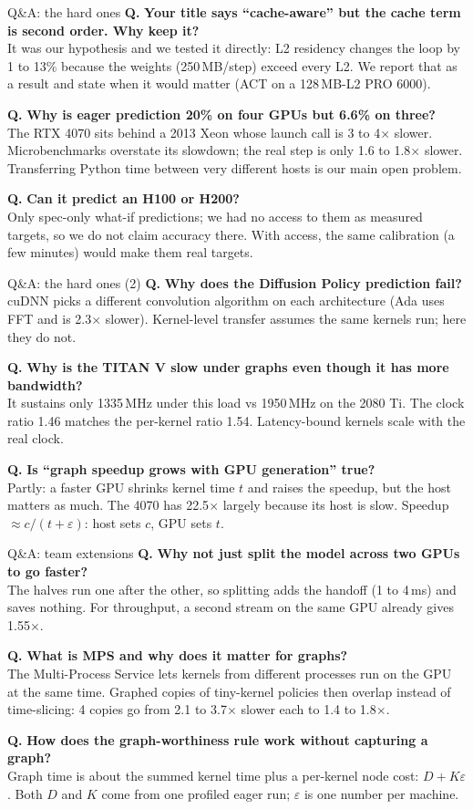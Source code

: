 \documentclass[aspectratio=169,10pt]{beamer}
\newcommand{\qa}[2]{\textbf{\textcolor{accent}{Q.}} \textbf{#1}\\[0.2em]{\small #2}\par\medskip}
\begin{document}
\begin{frame}{Q\&A: the hard ones}
\qa{Your title says ``cache-aware'' but the cache term is second order. Why keep it?}{It was
our hypothesis and we tested it directly: L2 residency changes the loop by 1 to 13\% because
the weights (250\,MB/step) exceed every L2. We report that as a result and state when it would
matter (ACT on a 128\,MB-L2 PRO 6000).}
\qa{Why is eager prediction 20\% on four GPUs but 6.6\% on three?}{The RTX 4070 sits behind a
2013 Xeon whose launch call is 3 to 4$\times$ slower. Microbenchmarks overstate its slowdown;
the real step is only 1.6 to 1.8$\times$ slower. Transferring Python time between very different
hosts is our main open problem.}
\qa{Can it predict an H100 or H200?}{Only spec-only what-if predictions; we had no access to
them as measured targets, so we do not claim accuracy there. With access, the same calibration
(a few minutes) would make them real targets.}
\end{frame}

\begin{frame}{Q\&A: the hard ones (2)}
\qa{Why does the Diffusion Policy prediction fail?}{cuDNN picks a different convolution
algorithm on each architecture (Ada uses FFT and is 2.3$\times$ slower). Kernel-level transfer
assumes the same kernels run; here they do not.}
\qa{Why is the TITAN V slow under graphs even though it has more bandwidth?}{It sustains only
1335\,MHz under this load vs 1950\,MHz on the 2080 Ti. The clock ratio 1.46 matches the
per-kernel ratio 1.54. Latency-bound kernels scale with the real clock.}
\qa{Is ``graph speedup grows with GPU generation'' true?}{Partly: a faster GPU shrinks kernel
time $t$ and raises the speedup, but the host matters as much. The 4070 has 22.5$\times$ largely
because its host is slow. Speedup $\approx c/(t+\varepsilon)$: host sets $c$, GPU sets $t$.}
\end{frame}

\begin{frame}{Q\&A: team extensions}
\qa{Why not just split the model across two GPUs to go faster?}{The halves run one after the
other, so splitting adds the handoff (1 to 4\,ms) and saves nothing. For throughput, a second
stream on the same GPU already gives 1.55$\times$.}
\qa{What is MPS and why does it matter for graphs?}{The Multi-Process Service lets kernels from
different processes run on the GPU at the same time. Graphed copies of tiny-kernel policies
then overlap instead of time-slicing: 4 copies go from 2.1 to 3.7$\times$ slower each to 1.4 to
1.8$\times$.}
\qa{How does the graph-worthiness rule work without capturing a graph?}{Graph time is about
the summed kernel time plus a per-kernel node cost: $D + K\varepsilon$. Both $D$ and $K$ come
from one profiled eager run; $\varepsilon$ is one number per machine.}
\end{frame}
\end{document}
